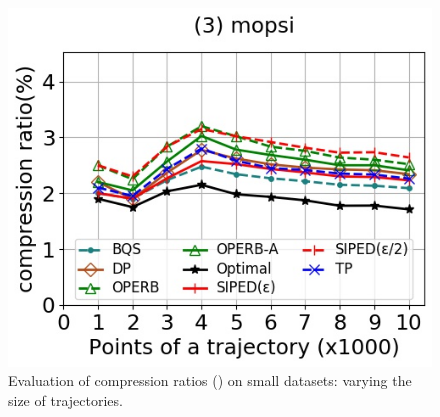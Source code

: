\begin{figure}[tb!]
	\includegraphics[scale=0.348]{Figures/Exp-PED-CR-size-mopsi.jpg}		
	\vspace{-2ex}
	\caption{\small Evaluation of compression ratios (\ped) on small datasets: varying the size of
		trajectories.}
	\label{fig:cr-ped-size}
	\vspace{-2ex}
\end{figure}
